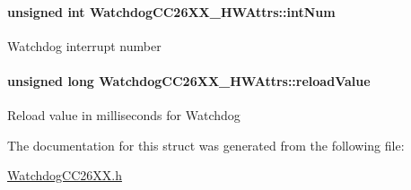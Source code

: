 \paragraph[{int\+Num}]{\setlength{\rightskip}{0pt plus 5cm}unsigned int Watchdog\+C\+C26\+X\+X\+\_\+\+H\+W\+Attrs\+::int\+Num}\label{struct_watchdog_c_c26_x_x___h_w_attrs_af18c0aa9b0cd8354d5f8a3dba21070be}
Watchdog interrupt number 
\paragraph[{reload\+Value}]{\setlength{\rightskip}{0pt plus 5cm}unsigned long Watchdog\+C\+C26\+X\+X\+\_\+\+H\+W\+Attrs\+::reload\+Value}\label{struct_watchdog_c_c26_x_x___h_w_attrs_a4d5992495525d1457f5aa356046ce055}
Reload value in milliseconds for Watchdog 

The documentation for this struct was generated from the following file\+:\begin{DoxyCompactItemize}
\item 
\hyperlink{_watchdog_c_c26_x_x_8h}{Watchdog\+C\+C26\+X\+X.\+h}\end{DoxyCompactItemize}
